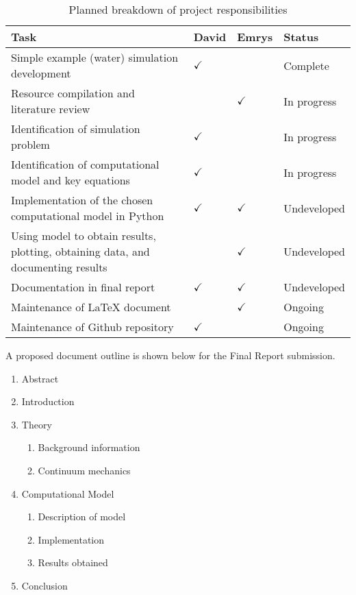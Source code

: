\begin{table}[H]
    \centering
    \caption{Planned breakdown of project responsibilities}
    \begin{tabular}{p{10cm}|ll|l}
    \textbf{Task} & \textbf{David} & \textbf{Emrys} & \textbf{Status} \\\hline
    Simple example (water) simulation development & $\checkmark$ & & Complete\\
    Resource compilation and literature review &  & $\checkmark$ & In progress\\
    Identification of simulation problem & $\checkmark$ & & In progress\\ 
    Identification of computational model and key equations & $\checkmark$ & & In progress \\
    Implementation of the chosen computational model in Python & $\checkmark$ & $\checkmark$ & Undeveloped\\
    Using model to obtain results, plotting, obtaining data, and documenting results & & $\checkmark$ & Undeveloped\\
    Documentation in final report & $\checkmark$ & $\checkmark$ & Undeveloped\\
    Maintenance of \LaTeX{} document & & $\checkmark$ & Ongoing\\
    Maintenance of Github repository & $\checkmark$ & & Ongoing\\
    \end{tabular}
    \label{tab:responsibilities}
\end{table}

A proposed document outline is shown below for the Final Report submission.
\begin{tcolorbox}[width=4in,
                  boxsep=0pt,
                  left=0pt,
                  right=0pt,
                  top=2pt,
                  arc=0pt,
                  boxrule=1pt,
                  colback=white
                  ]%
\begin{enumerate}
    \item Abstract
    \item Introduction
    \item Theory
    \begin{enumerate}[1.]
        \item Background information
        \item Continuum mechanics
    \end{enumerate}
    \item Computational Model
    \begin{enumerate}[1.]
        \item Description of model
        \item Implementation
        \item Results obtained
    \end{enumerate}
    \item Conclusion
\end{enumerate}
\end{tcolorbox}


